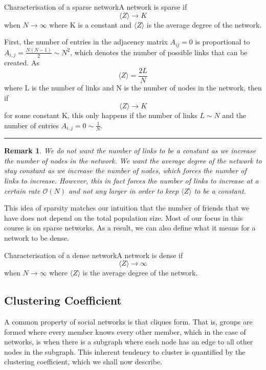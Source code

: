 \documentclass[twoside]{article}
\newtheorem{remark}[theorem]{Remark}
\newenvironment{proof}{{\bf Proof:}}{\hfill\rule{2mm}{2mm}}
\begin{document}
\begin{proposition_exam}{Characterisation of a sparse network}{}A network is sparse if $$\langle Z \rangle \rightarrow K$$ when $N \rightarrow \infty$ where K is a constant and $\langle Z \rangle$ is the average degree of the network.
\end{proposition_exam}
\begin{proof} First, the number of entries in the adjacency matrix $A_{ij} = 0$ is proportional to $A_{i,j} = \frac{N(N - 1)}{2} \sim N^2$, which denotes the number of possible links that can be created. As 
$$
\langle Z \rangle = \frac{2L}{N}
$$
where L is the number of links and N is the number of nodes in the network, then if 
$$
\langle Z \rangle \rightarrow K
$$
for some constant K, this only happens if the number of links $L \sim N$ and the number of entries $A_{i,j} = 0 \sim \frac{1}{N}$.
\end{proof}

\begin{remark} We do not want the number of links to be a constant as we increase the number of nodes in the network. We want the average degree of the network to stay constant as we increase the number of nodes, which forces the number of links to increase. However, this in fact forces the number of links to increase at a certain rate $\mathcal{O}(N)$ and not any larger in order to keep $\langle Z \rangle$ to be a constant.
\end{remark}

This idea of sparsity matches our intuition that the number of friends that we have does not depend on the total population size. Most of our focus in this course is on sparse networks. As a result, we can also define what it means for a network to be dense.

\begin{proposition_exam}{Characterisation of a dense network}{}A network is dense if $$\langle Z \rangle \rightarrow \infty$$ when $N \rightarrow \infty$ where $\langle Z \rangle$ is the average degree of the network.
\end{proposition_exam}

\subsection{Clustering Coefficient}

A common property of social networks is that cliques form. That is, groups are formed where every member knows every other member, which in the case of networks, is when there is a subgraph where each node has an edge to all other nodes in the subgraph. This inherent tendency to cluster is quantified by the clustering coefficient, which we shall now describe.
\end{document}
